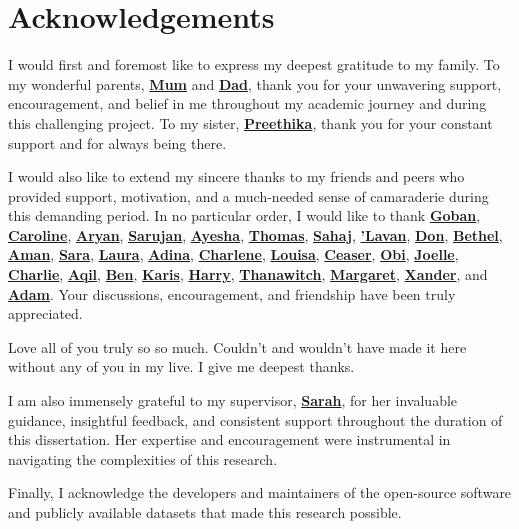 
\section*{Acknowledgements}

\noindent I would first and foremost like to express my deepest gratitude to my family. To my wonderful parents, \uline{\textbf{Mum}} and \uline{\textbf{Dad}}, thank you for your unwavering support, encouragement, and belief in me throughout my academic journey and during this challenging project. To my sister, \uline{\textbf{Preethika}}, thank you for your constant support and for always being there.\newline

\noindent I would also like to extend my sincere thanks to my friends and peers who provided support, motivation, and a much-needed sense of camaraderie during this demanding period. In no particular order, I would like to thank \uline{\textbf{Goban}}, \uline{\textbf{Caroline}}, \uline{\textbf{Aryan}}, \uline{\textbf{Sarujan}}, \uline{\textbf{Ayesha}}, \uline{\textbf{Thomas}}, \uline{\textbf{Sahaj}}, \uline{\textbf{'Lavan}}, \uline{\textbf{Don}}, \uline{\textbf{Bethel}}, \uline{\textbf{Aman}}, \uline{\textbf{Sara}}, \uline{\textbf{Laura}}, \uline{\textbf{Adina}}, \uline{\textbf{Charlene}}, \uline{\textbf{Louisa}}, \uline{\textbf{Ceaser}}, \uline{\textbf{Obi}}, \uline{\textbf{Joelle}}, \uline{\textbf{Charlie}}, \uline{\textbf{Aqil}}, \uline{\textbf{Ben}}, \uline{\textbf{Karis}}, \uline{\textbf{Harry}}, \uline{\textbf{Thanawitch}}, \uline{\textbf{Margaret}}, \uline{\textbf{Xander}}, and \uline{\textbf{Adam}}. Your discussions, encouragement, and friendship have been truly appreciated.\newline

\noindent Love all of you truly so so much. Couldn't and wouldn't have made it here without any of you in my live. I give me deepest thanks.

\noindent I am also immensely grateful to my supervisor, \uline{\textbf{Sarah}}, for her invaluable guidance, insightful feedback, and consistent support throughout the duration of this dissertation. Her expertise and encouragement were instrumental in navigating the complexities of this research.\newline

\noindent Finally, I acknowledge the developers and maintainers of the open-source software and publicly available datasets that made this research possible.